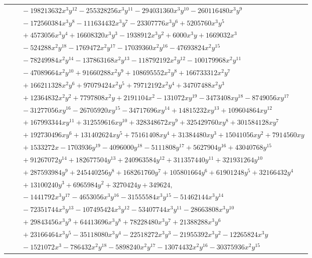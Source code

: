 \documentclass[11pt]{article}
\begin{document}
\begin{longtable}{@{}ll@{}}
 & $\quad -198213632x^{3}y^{12}-255328256x^{3}y^{11}-294031360x^{3}y^{10}-260116480x^{3}y^{9}$\\
 & $\quad -172560384x^{3}y^{8}-111634432x^{3}y^{7}-23307776x^{3}y^{6}+5205760x^{3}y^{5}$\\
 & $\quad +4573056x^{3}y^{4}+16608320x^{3}y^{3}-1938912x^{3}y^{2}+6000x^{3}y+1669032x^{3}$\\
 & $\quad -524288x^{2}y^{18}-1769472x^{2}y^{17}-17039360x^{2}y^{16}-47693824x^{2}y^{15}$\\
 & $\quad -78249984x^{2}y^{14}-137863168x^{2}y^{13}-118792192x^{2}y^{12}-100179968x^{2}y^{11}$\\
 & $\quad -47089664x^{2}y^{10}+91660288x^{2}y^{9}+108695552x^{2}y^{8}+166733312x^{2}y^{7}$\\
 & $\quad +166211328x^{2}y^{6}+97079424x^{2}y^{5}+79712192x^{2}y^{4}+34707488x^{2}y^{3}$\\
 & $\quad +12364832x^{2}y^{2}+7797808x^{2}y+2191104x^{2}-131072xy^{19}-3473408xy^{18}-8749056xy^{17}$\\
 & $\quad -31277056xy^{16}-26705920xy^{15}-34717696xy^{14}+14815232xy^{13}+109604864xy^{12}$\\
 & $\quad +167993344xy^{11}+312559616xy^{10}+328348672xy^{9}+325429760xy^{8}+301584128xy^{7}$\\
 & $\quad +192730496xy^{6}+131402624xy^{5}+75161408xy^{4}+31384480xy^{3}+15041056xy^{2}+7914560xy$\\
 & $\quad +1533272x-1703936y^{19}-4096000y^{18}-5111808y^{17}+5627904y^{16}+43040768y^{15}$\\
 & $\quad +91267072y^{14}+182677504y^{13}+240963584y^{12}+311357440y^{11}+321931264y^{10}$\\
 & $\quad +287593984y^{9}+245440256y^{8}+168261760y^{7}+105801664y^{6}+61901248y^{5}+32166432y^{4}$\\
 & $\quad +13100240y^{3}+6965984y^{2}+3270424y+349624,$\\
 & $\quad -1441792x^{3}y^{17}-4653056x^{3}y^{16}-31555584x^{3}y^{15}-51462144x^{3}y^{14}$\\
 & $\quad -72351744x^{3}y^{13}-107495424x^{3}y^{12}-53407744x^{3}y^{11}-28663808x^{3}y^{10}$\\
 & $\quad +29843456x^{3}y^{9}+64413696x^{3}y^{8}+78228480x^{3}y^{7}+21388288x^{3}y^{6}$\\
 & $\quad +23166464x^{3}y^{5}-35118080x^{3}y^{4}-22518272x^{3}y^{3}-21955392x^{3}y^{2}-12265824x^{3}y$\\
 & $\quad -1521072x^{3}-786432x^{2}y^{18}-5898240x^{2}y^{17}-13074432x^{2}y^{16}-30375936x^{2}y^{15}$\\

\end{longtable}
\end{document}
